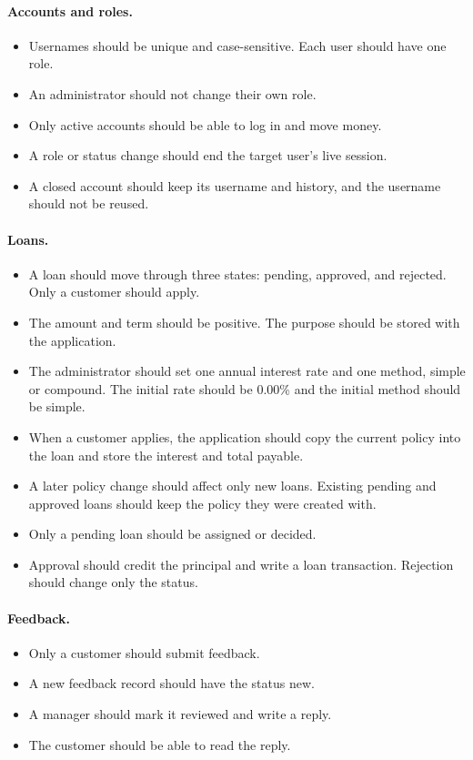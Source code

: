 \documentclass[11pt,a4paper]{article}
\begin{document}
\paragraph{Accounts and roles.}
\begin{itemize}
\item Usernames should be unique and case-sensitive. Each user should have one role.
\item An administrator should not change their own role.
\item Only active accounts should be able to log in and move money.
\item A role or status change should end the target user's live session.
\item A closed account should keep its username and history, and the username should not be reused.
\end{itemize}

\paragraph{Loans.}
\begin{itemize}
\item A loan should move through three states: pending, approved, and rejected. Only a customer should apply.
\item The amount and term should be positive. The purpose should be stored with the application.
\item The administrator should set one annual interest rate and one method, simple or compound. The initial rate should be 0.00\% and the initial method should be simple.
\item When a customer applies, the application should copy the current policy into the loan and store the interest and total payable.
\item A later policy change should affect only new loans. Existing pending and approved loans should keep the policy they were created with.
\item Only a pending loan should be assigned or decided.
\item Approval should credit the principal and write a loan transaction. Rejection should change only the status.
\end{itemize}

\paragraph{Feedback.}
\begin{itemize}
\item Only a customer should submit feedback.
\item A new feedback record should have the status new.
\item A manager should mark it reviewed and write a reply.
\item The customer should be able to read the reply.
\end{itemize}
\end{document}
